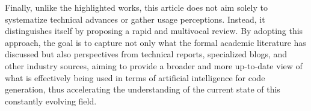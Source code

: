 Finally, unlike the highlighted works, this article does not aim solely to systematize technical advances or gather usage perceptions. Instead, it distinguishes itself by proposing a rapid and multivocal review. By adopting this approach, the goal is to capture not only what the formal academic literature has discussed but also perspectives from technical reports, specialized blogs, and other industry sources, aiming to provide a broader and more up-to-date view of what is effectively being used in terms of artificial intelligence for code generation, thus accelerating the understanding of the current state of this constantly evolving field.



